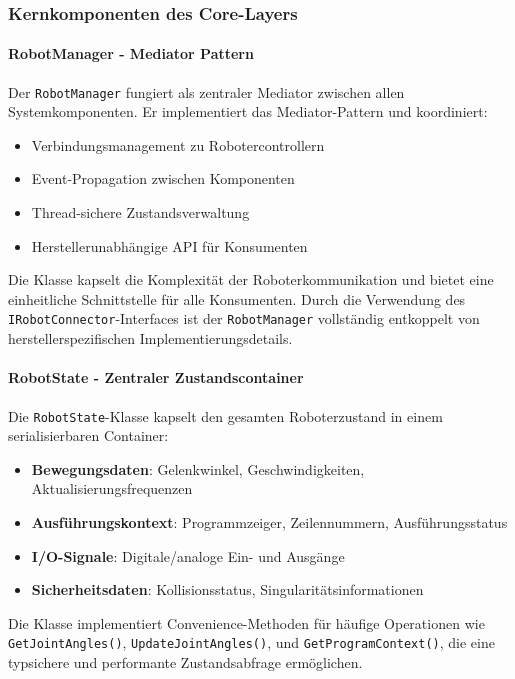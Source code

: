 \subsubsection{Kernkomponenten des Core-Layers}

\paragraph{RobotManager - Mediator Pattern}
Der \texttt{RobotManager} fungiert als zentraler Mediator zwischen allen
Systemkomponenten. Er implementiert das Mediator-Pattern \cite{gamma1995design}
und koordiniert:
\begin{itemize}
    \item Verbindungsmanagement zu Robotercontrollern
    \item Event-Propagation zwischen Komponenten
    \item Thread-sichere Zustandsverwaltung
    \item Herstellerunabhängige API für Konsumenten
\end{itemize}

Die Klasse kapselt die Komplexität der Roboterkommunikation und bietet eine
einheitliche Schnittstelle für alle Konsumenten. Durch die Verwendung des
\texttt{IRobotConnector}-Interfaces ist der \texttt{RobotManager} vollständig
entkoppelt von herstellerspezifischen Implementierungsdetails.

\paragraph{RobotState - Zentraler Zustandscontainer}
Die \texttt{RobotState}-Klasse kapselt den gesamten Roboterzustand in einem
serialisierbaren Container:
\begin{itemize}
    \item \textbf{Bewegungsdaten}: Gelenkwinkel, Geschwindigkeiten, Aktualisierungsfrequenzen
    \item \textbf{Ausführungskontext}: Programmzeiger, Zeilennummern, Ausführungsstatus
    \item \textbf{I/O-Signale}: Digitale/analoge Ein- und Ausgänge
    \item \textbf{Sicherheitsdaten}: Kollisionsstatus, Singularitätsinformationen
\end{itemize}

Die Klasse implementiert Convenience-Methoden für häufige Operationen wie
\texttt{GetJointAngles()}, \texttt{UpdateJointAngles()}, und
\texttt{GetProgramContext()}, die eine typsichere und performante
Zustandsabfrage ermöglichen.

